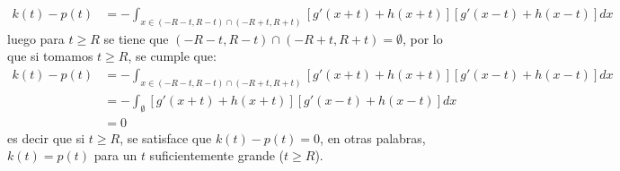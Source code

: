 \begin{homeworkProblem}
\begin{enumerate}[i)]
\begin{solucion}
        \begin{align*}
          k(t)-p(t)&=-\int_{x\in(-R-t,R-t)\cap(-R+t,R+t)}[g'(x+t)+h(x+t)][g'(x-t)+h(x-t)]dx
        \end{align*}
        luego para $t\geq R$ se tiene que $(-R-t,R-t)\cap(-R+t,R+t)=\emptyset$, por lo que si tomamos $t\geq R$, se cumple que:
        \begin{align*}
          k(t)-p(t)&=-\int_{x\in(-R-t,R-t)\cap(-R+t,R+t)}[g'(x+t)+h(x+t)][g'(x-t)+h(x-t)]dx\\
          &=-\int_{\emptyset}[g'(x+t)+h(x+t)][g'(x-t)+h(x-t)]dx\\
          &=0
        \end{align*}
        es decir que si $t\geq R$, se satisface que $k(t)-p(t)=0$, en otras palabras, $k(t)=p(t)$ para un $t$ suficientemente grande ($t\geq R$).
        \demostrado
      \end{solucion}
  \end{enumerate}
\end{homeworkProblem}
